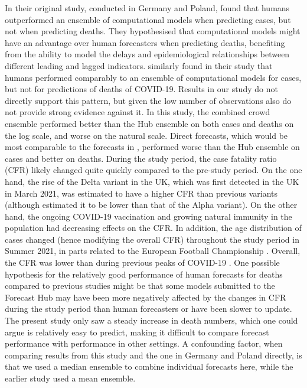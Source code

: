 \documentclass[10pt,a4paper,twocolumn]{article}
\begin{document}
In their original study, conducted in Germany and Poland, \citet{bosseComparingHumanModelbased2022} found that humans outperformed an ensemble of computational models when predicting cases, but not when predicting deaths. They hypothesised that computational models might have an advantage over human forecasters when predicting deaths, benefiting from the ability to model the delays and epidemiological relationships between different leading and lagged indicators. \citet{mcandrewChimericForecastingCombining2022} similarly found in their study that humans performed comparably to an ensemble of computational models for cases, but not for predictions of deaths of COVID-19. 
Results in our study do not directly support this pattern, but given the low number of observations also do not provide strong evidence against it. In this study, the combined crowd ensemble performed better than the Hub ensemble on both cases and deaths on the log scale, and worse on the natural scale. Direct forecasts, which would be most comparable to the forecasts in \citep{bosseComparingHumanModelbased2022}, performed worse than the Hub ensemble on cases and better on deaths. 
During the study period, the case fatality ratio (CFR) likely changed quite quickly compared to the pre-study period. On the one hand, the rise of the Delta variant in the UK, which was first detected in the UK in March 2021, was estimated to have a higher CFR than previous variants \citep{bastIncreasedRiskHospitalisation2021, twohigHospitalAdmissionEmergency2022} (although \citep{perez-guzmanEpidemiologicalDriversTransmissibility2023} estimated it to be lower than that of the Alpha variant). On the other hand, the ongoing COVID-19 vaccination and growing natural immunity in the population had decreasing effects on the CFR. In addition, the age distribution of cases changed (hence modifying the overall CFR) throughout the study period in Summer 2021, in parts related to the European Football Championship \citep{dehningImpactEuro20202023}. Overall, the CFR was lower than during previous peaks of COVID-19 \citep{perez-guzmanEpidemiologicalDriversTransmissibility2023}.
One possible hypothesis for the relatively good performance of human forecasts for deaths compared to previous studies might be that some models submitted to the Forecast Hub may have been more negatively affected by the changes in CFR during the study period than human forecasters or have been slower to update. The present study only saw a steady increase in death numbers, which one could argue is relatively easy to predict, making it difficult to compare forecast performance with performance in other settings. A confounding factor, when comparing results from this study and the one in Germany and Poland directly, is that we used a median ensemble to combine individual forecasts here, while the earlier study used a mean ensemble. 
\end{document}

